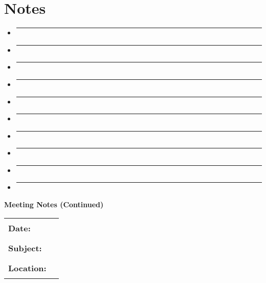 \documentclass[a4paper,10pt]{article}
\begin{document}
\section*{Notes}
\begin{itemize}[leftmargin=*,label={}]
    \item \rule{0.9\textwidth}{0.4pt} \vspace{0.1cm}
    \item \rule{0.9\textwidth}{0.4pt} \vspace{0.1cm}
    \item \rule{0.9\textwidth}{0.4pt} \vspace{0.1cm}
    \item \rule{0.9\textwidth}{0.4pt} \vspace{0.1cm}
    \item \rule{0.9\textwidth}{0.4pt} \vspace{0.1cm}
    \item \rule{0.9\textwidth}{0.4pt} \vspace{0.1cm}
    \item \rule{0.9\textwidth}{0.4pt} \vspace{0.1cm}
    \item \rule{0.9\textwidth}{0.4pt} \vspace{0.1cm}
    \item \rule{0.9\textwidth}{0.4pt} \vspace{0.1cm}
    \item \rule{0.9\textwidth}{0.4pt}
\end{itemize}

\clearpage

\begin{center}
    {\large\bfseries Meeting Notes (Continued)}
    \vspace{0.2cm}
    
    \vspace{0.1cm}
    
    \begin{tabular}{@{}p{} p{}@{}}
        \textbf{Date:} & \rule{0.4\textwidth}{0.4pt} \\
        \textbf{Subject:} & \rule{0.4\textwidth}{0.4pt} \\
        \textbf{Location:} & \rule{0.4\textwidth}{0.4pt} \\
    \end{tabular}
\end{center}
\end{document}
